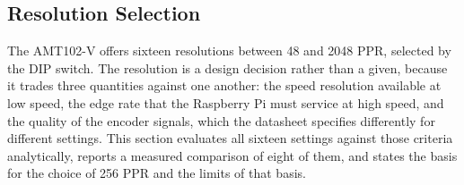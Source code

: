 
\subsection{Resolution Selection}
\label{subsec:agit-ppr}

The AMT102-V offers sixteen resolutions between 48 and 2048 PPR, selected by the DIP switch. The resolution is a design decision rather than a given, because it trades three quantities against one another: the speed resolution available at low speed, the edge rate that the Raspberry Pi must service at high speed, and the quality of the encoder signals, which the datasheet specifies differently for different settings. This section evaluates all sixteen settings against those criteria analytically, reports a measured comparison of eight of them, and states the basis for the choice of 256 PPR and the limits of that basis.

